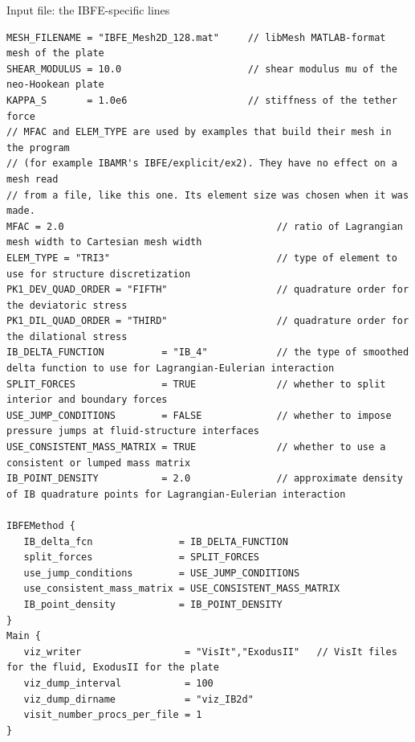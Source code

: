 \documentclass[aspectratio=169,11pt]{beamer}
\begin{document}
\begin{frame}[fragile]{Input file: the IBFE-specific lines}
\label{fr:input}
\footnotesize
\begin{lstlisting}[style=inputtiny]
MESH_FILENAME = "IBFE_Mesh2D_128.mat"     // libMesh MATLAB-format mesh of the plate
SHEAR_MODULUS = 10.0                      // shear modulus mu of the neo-Hookean plate
KAPPA_S       = 1.0e6                     // stiffness of the tether force
// MFAC and ELEM_TYPE are used by examples that build their mesh in the program
// (for example IBAMR's IBFE/explicit/ex2). They have no effect on a mesh read
// from a file, like this one. Its element size was chosen when it was made.
MFAC = 2.0                                     // ratio of Lagrangian mesh width to Cartesian mesh width
ELEM_TYPE = "TRI3"                             // type of element to use for structure discretization
PK1_DEV_QUAD_ORDER = "FIFTH"                   // quadrature order for the deviatoric stress
PK1_DIL_QUAD_ORDER = "THIRD"                   // quadrature order for the dilational stress
IB_DELTA_FUNCTION          = "IB_4"            // the type of smoothed delta function to use for Lagrangian-Eulerian interaction
SPLIT_FORCES               = TRUE              // whether to split interior and boundary forces
USE_JUMP_CONDITIONS        = FALSE             // whether to impose pressure jumps at fluid-structure interfaces
USE_CONSISTENT_MASS_MATRIX = TRUE              // whether to use a consistent or lumped mass matrix
IB_POINT_DENSITY           = 2.0               // approximate density of IB quadrature points for Lagrangian-Eulerian interaction

IBFEMethod {
   IB_delta_fcn               = IB_DELTA_FUNCTION
   split_forces               = SPLIT_FORCES
   use_jump_conditions        = USE_JUMP_CONDITIONS
   use_consistent_mass_matrix = USE_CONSISTENT_MASS_MATRIX
   IB_point_density           = IB_POINT_DENSITY
}
Main {
   viz_writer                  = "VisIt","ExodusII"   // VisIt files for the fluid, ExodusII for the plate
   viz_dump_interval           = 100
   viz_dump_dirname            = "viz_IB2d"
   visit_number_procs_per_file = 1
}
\end{lstlisting}
\end{frame}
\end{document}
